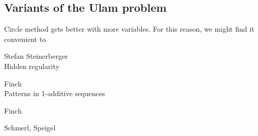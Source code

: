 \documentclass{article}
\theoremstyle{definition}
\theoremstyle{remark}
\numberwithin{equation}{section}
\begin{document}
{\subsection{Variants of the Ulam problem}


Circle method gets better with more variables.  For this reason, we
might find it convenient to 










\begin{thebibliography}{9}
Stefan Steinerberger\\
Hidden regularity

Finch\\
Patterns in 1-additive sequences
 
Finch
 
Schmerl, Speigel
 

\end{thebibliography}}
\end{document}

